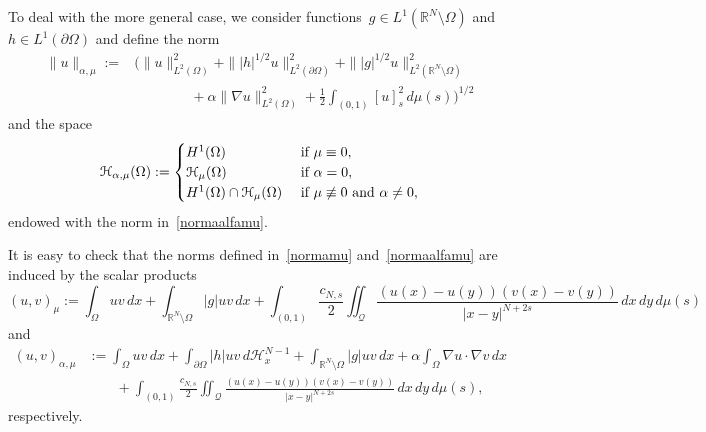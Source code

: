 \documentclass[12pt,a4paper,intlimits,sumlimits]{amsart}
\def \R {\mathbb{R}}
\def \Q {\mathcal Q}
\theoremstyle{definition}
\theoremstyle{plain}
\numberwithin{equation}{section}
\begin{document}
To deal with the more general case, 
we consider functions~$g\in L^1(\R^N\setminus\Omega)$ and~$h\in L^1(\partial\Omega)$ and define the norm
\begin{equation}\label{normaalfamu}
\begin{split}
\|u\|_{\alpha, \mu} := &\Bigg(\|u\|^2_{L^2(\Omega)} + \||h|^{1/2} u\|^2_{L^2(\partial\Omega)} + \| |g|^{1/2} u\|^2_{L^2(\R^N\setminus\Omega)} \\
&\qquad\qquad+ \alpha \|\nabla u\|^2_{L^2(\Omega)} +\frac12 \int_{(0, 1)} [u]_s^2 \, d\mu(s) \Bigg)^{1/2}
\end{split}
\end{equation}
and the space
\begin{equation}\label{HALPHAMU}
\mathcal H_{\alpha, \mu} (\Omega):= \begin{cases}
H^1(\Omega) &\hbox{ if } \mu \equiv 0,\\
\mathcal H_\mu (\Omega) &\hbox{ if } \alpha = 0,\\
H^1(\Omega)\cap \mathcal H_\mu (\Omega) &\hbox{ if }  \mu \not\equiv 0 \text{ and } \alpha\neq 0,
\end{cases}
\end{equation}
endowed with the norm in~\eqref{normaalfamu}.

It is easy to check that the norms defined in~\eqref{normamu} and~\eqref{normaalfamu} are induced by the scalar products
\begin{equation}\label{prodottoscalaremu}
(u,v)_\mu:=\int_\Omega uv\,dx
+\int_{\R^N\setminus \Omega}|g|uv\,dx
+\int_{(0,1)} \frac{c_{N,s}}{2}
\iint_\Q \frac{(u(x)-u(y))(v(x)-v(y))}{|x-y|^{N+2s}}\,dx\,dy\,d\mu(s)
\end{equation}
and
\begin{equation}\label{prodottoscalarealfamu}
\begin{aligned}
(u,v)_{\alpha,\mu}&:=\int_\Omega uv\,dx
+\int_{\partial \Omega}|h|uv\,d\mathscr H_x^{N-1}
+\int_{\R^N\setminus \Omega}|g|uv\,dx
+\alpha\int_\Omega \nabla u\cdot \nabla v\,dx \\
&\qquad+\int_{(0,1)} \frac{c_{N,s}}{2}
\iint_\Q \frac{(u(x)-u(y))(v(x)-v(y))}{|x-y|^{N+2s}}\,dx\,dy\,d\mu(s),
\end{aligned}
\end{equation}
respectively.
\end{document}
